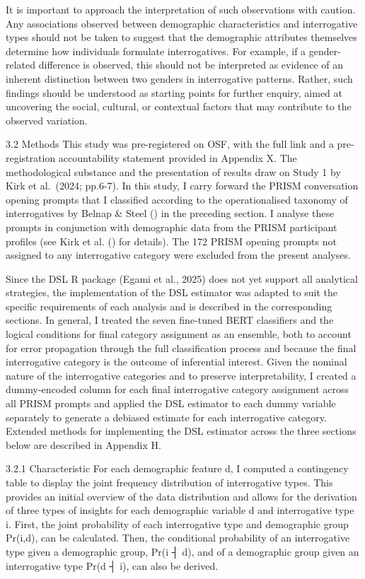 \documentclass[
  12pt,
]{article}
\begin{document}
It is important to approach the interpretation of such observations with caution. Any associations observed between demographic characteristics and interrogative types should not be taken to suggest that the demographic attributes themselves determine how individuals formulate interrogatives. For example, if a gender-related difference is observed, this should not be interpreted as evidence of an inherent distinction between two genders in interrogative patterns. Rather, such findings should be understood as starting points for further enquiry, aimed at uncovering the social, cultural, or contextual factors that may contribute to the observed variation.

3.2 Methods
This study was pre-registered on OSF, with the full link and a pre-registration accountability statement provided in Appendix X. The methodological substance and the presentation of results draw on Study 1 by Kirk et al.~(2024; pp.6-7). In this study, I carry forward the PRISM conversation opening prompts that I classified according to the operationalised taxonomy of interrogatives by Belnap \& Steel () in the preceding section. I analyse these prompts in conjunction with demographic data from the PRISM participant profiles (see Kirk et al. () for details). The 172 PRISM opening prompts not assigned to any interrogative category were excluded from the present analyses.

Since the DSL R package (Egami et al., 2025) does not yet support all analytical strategies, the implementation of the DSL estimator was adapted to suit the specific requirements of each analysis and is described in the corresponding sections. In general, I treated the seven fine-tuned BERT classifiers and the logical conditions for final category assignment as an ensemble, both to account for error propagation through the full classification process and because the final interrogative category is the outcome of inferential interest. Given the nominal nature of the interrogative categories and to preserve interpretability, I created a dummy-encoded column for each final interrogative category assignment across all PRISM prompts and applied the DSL estimator to each dummy variable separately to generate a debiased estimate for each interrogative category. Extended methods for implementing the DSL estimator across the three sections below are described in Appendix H.

3.2.1 Characteristic
For each demographic feature d, I computed a contingency table to display the joint frequency distribution of interrogative types. This provides an initial overview of the data distribution and allows for the derivation of three types of insights for each demographic variable d and interrogative type i. First, the joint probability of each interrogative type and demographic group Pr⁡(i,d), can be calculated. Then, the conditional probability of an interrogative type given a demographic group, Pr⁡(i ┤\textbar{} d), and of a demographic group given an interrogative type Pr⁡(d ┤\textbar{} i), can also be derived.
\end{document}
